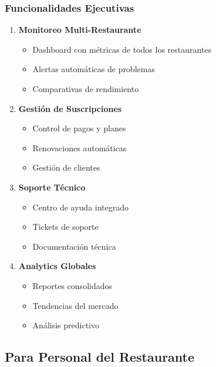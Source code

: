 \documentclass[12pt,a4paper]{article}
\begin{document}
\subsubsection{Funcionalidades Ejecutivas}
\begin{enumerate}
    \item \textbf{Monitoreo Multi-Restaurante}
    \begin{itemize}
        \item Dashboard con métricas de todos los restaurantes
        \item Alertas automáticas de problemas
        \item Comparativas de rendimiento
    \end{itemize}
    
    \item \textbf{Gestión de Suscripciones}
    \begin{itemize}
        \item Control de pagos y planes
        \item Renovaciones automáticas
        \item Gestión de clientes
    \end{itemize}
    
    \item \textbf{Soporte Técnico}
    \begin{itemize}
        \item Centro de ayuda integrado
        \item Tickets de soporte
        \item Documentación técnica
    \end{itemize}
    
    \item \textbf{Analytics Globales}
    \begin{itemize}
        \item Reportes consolidados
        \item Tendencias del mercado
        \item Análisis predictivo
    \end{itemize}
\end{enumerate}

\subsection{Para Personal del Restaurante}
\end{document}
